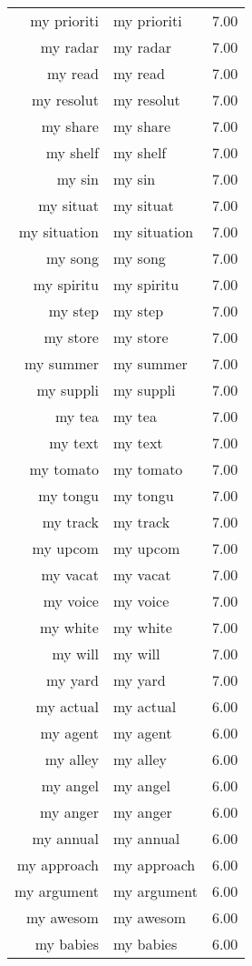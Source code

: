 \begin{table}[ht]
\begin{tabular}{rlr}
  my prioriti & my prioriti & 7.00 \\ 
  my radar & my radar & 7.00 \\ 
  my read & my read & 7.00 \\ 
  my resolut & my resolut & 7.00 \\ 
  my share & my share & 7.00 \\ 
  my shelf & my shelf & 7.00 \\ 
  my sin & my sin & 7.00 \\ 
  my situat & my situat & 7.00 \\ 
  my situation & my situation & 7.00 \\ 
  my song & my song & 7.00 \\ 
  my spiritu & my spiritu & 7.00 \\ 
  my step & my step & 7.00 \\ 
  my store & my store & 7.00 \\ 
  my summer & my summer & 7.00 \\ 
  my suppli & my suppli & 7.00 \\ 
  my tea & my tea & 7.00 \\ 
  my text & my text & 7.00 \\ 
  my tomato & my tomato & 7.00 \\ 
  my tongu & my tongu & 7.00 \\ 
  my track & my track & 7.00 \\ 
  my upcom & my upcom & 7.00 \\ 
  my vacat & my vacat & 7.00 \\ 
  my voice & my voice & 7.00 \\ 
  my white & my white & 7.00 \\ 
  my will & my will & 7.00 \\ 
  my yard & my yard & 7.00 \\ 
  my actual & my actual & 6.00 \\ 
  my agent & my agent & 6.00 \\ 
  my alley & my alley & 6.00 \\ 
  my angel & my angel & 6.00 \\ 
  my anger & my anger & 6.00 \\ 
  my annual & my annual & 6.00 \\ 
  my approach & my approach & 6.00 \\ 
  my argument & my argument & 6.00 \\ 
  my awesom & my awesom & 6.00 \\ 
  my babies & my babies & 6.00 \\ 

\end{tabular}
\end{table}
